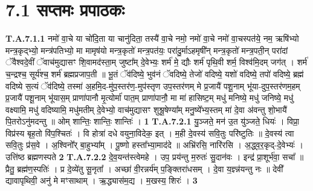 \documentclass[17pt]{extarticle}
\begin{document}
\section*{ 7.1     सप्तमः प्रपाठकः }
                                \textbf{ T.A.7.1.1} \newline
                  नमो॑ वा॒चे या चो॑दि॒ता या चानु॑दिता॒ तस्यै॑ वा॒चे नमो॒ नमो॑ वा॒चे नमो॑ वा॒चस्पत॑ये॒ नम॒ ऋषि॑भ्यो मन्त्र॒कृद्भ्यो॒ मन्त्र॑पतिभ्यो॒ मा मामृष॑यो मन्त्र॒कृतो॑ मन्त्र॒पत॑यः॒ परा॑दु॒र्माऽहमृषी᳚न् मन्त्र॒कृतो॑ मन्त्र॒पती॒न् परा॑दां ॅवैश्वदे॒वीं ॅवाच॑मुद्यासꣳ शि॒वामद॑स्ता॒म् जुष्टा᳚म् दे॒वेभ्यः॒ शर्म॑ मे॒ द्यौः शर्म॑ पृथि॒वी शर्म॒ विश्व॑मि॒दम् जग॑त् ।  शर्म॑ च॒न्द्रश्च॒ सूर्य॑श्च॒ शर्म॑ ब्रह्मप्रजाप॒ती ॥  भू॒तं ॅव॑दिष्ये॒ भुव॑नं ॅवदिष्ये॒ तेजो॑ वदिष्ये॒ यशो॑ वदिष्ये॒ तपो॑ वदिष्ये॒ ब्रह्म॑ वदिष्ये स॒त्यं ॅव॑दिष्ये॒ तस्मा॑ अ॒हमि॒द-मु॑प॒स्तर॑ण॒-मुप॑स्तृण उप॒स्तर॑णम् मे प्र॒जायै॑ पशू॒नाम् भू॑या-दुप॒स्तर॑णम॒हम् प्र॒जायै॑ पशू॒नाम् भू॑यास॒म् प्राणा॑पानौ मृ॒त्योर्मा॑ पात॒म् प्राणा॑पानौ॒ मा मा॑ हासिष्ट॒म् मधु॑ मनिष्ये॒ मधु॑ जनिष्ये॒ मधु॑ वक्ष्यामि॒ मधु॑ वदिष्यामि॒ मधु॑मतीम् दे॒वेभ्यो॒ वाच॑मुद्यासꣳ शुश्रू॒षेण्या᳚म् मनु॒ष्ये᳚भ्य॒स्तम् मा॑ दे॒वा अ॑वन्तु शो॒भायै॑ पि॒तरोऽनु॑मदन्तु ॥  ओम् शान्तिः॒ शान्तिः॒ शान्तिः॑ । \textbf{ 1} \newline
                  \newline
                                                         \textbf{} \newline \newline
                                \textbf{ T.A.7.2.1} \newline
                  यु॒ञ्जते॒ मन॑ उ॒त यु॑ञ्जते॒ धियः॑ । विप्रा॒ विप्र॑स्य बृह॒तो वि॑प॒श्चितः॑ । वि होत्रा॑ दधे वयुना॒विदेक॒ इत् । म॒ही दे॒वस्य॑ सवि॒तुः परि॑ष्टुतिः ॥ दे॒वस्य॑ त्वा सवि॒तुः प्र॑स॒वे । अ॒श्विनो᳚र् बा॒हुभ्या᳚म् ।  पू॒ष्णो हस्ता᳚भ्या॒माद॑दे ॥ अभ्रि॑रसि॒ नारि॑रसि ।  अ॒द्ध्व॒र॒कृद्-दे॒वेभ्यः॑ । उत्ति॑ष्ठ ब्रह्मणस्पते \textbf{ 2} \newline
                  \newline
                                                                  \textbf{ T.A.7.2.2} \newline
                  दे॒व॒यन्त॑स्त्वेमहे । उप॒ प्रय॑न्तु म॒रुतः॑ सु॒दान॑वः । इन्द्र॑ प्रा॒शूर्भ॑वा॒ सचा᳚ ॥ प्रैतु॒ ब्रह्म॑ण॒स्पतिः॑ । प्र दे॒व्ये॑तु सू॒नृता᳚ ।  अच्छा॑ वी॒रन्नर्य॑म् प॒ङ्क्तिरा॑धसम् । दे॒वा य॒ज्ञ्न्न॑यन्तु नः ॥ देवी᳚ द्यावापृथिवी॒ अनु॑ मे मꣳसाथाम् । ऋ॒द्ध्यास॑म॒द्य । म॒खस्य॒ शिरः॑ । \textbf{ 3} \newline
                  \newline
\end{document}
